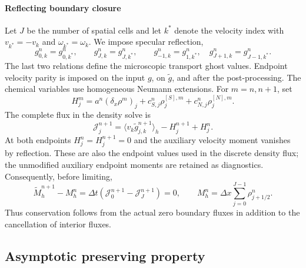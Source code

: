 \documentclass[11pt,twoside]{article}
\numberwithin{equation}{section}
\theoremstyle{plain}
\theoremstyle{nonumberplain}
\newif\ifrevisionred
\newenvironment{revisionblock}{\begingroup\ifrevisionred\color{red}\fi}{\endgroup}
\begin{document}
{\begin{revisionblock}
\paragraph{Reflecting boundary closure}
Let $J$ be the number of spatial cells and let $k^*$ denote the velocity index with
$v_{k^*}=-v_k$ and $\omega_{k^*}=\omega_k$. We impose specular reflection,
\[
g_{0,k}^n=g_{0,k^*}^n,\qquad g_{J,k}^n=g_{J,k^*}^n,
\qquad
g_{-1,k}^n=g_{1,k^*}^n,\quad g_{J+1,k}^n=g_{J-1,k^*}^n.
\]
The last two relations define the microscopic transport ghost values. Endpoint
velocity parity is imposed on the input $g$, on $\widetilde g$, and after the
post-processing. The chemical variables use homogeneous Neumann extensions.
For $m=n,n+1$, set
\[
H_j^m=a^n(\delta_x\rho^m)_j+c_{S,j}^n\rho_j^{[S],m}
+c_{N,j}^n\rho_j^{[N],m}.
\]
The complete flux in the density solve is
\[
\mathcal J_j^{n+1}=\langle v_k\widetilde g_{j,k}^{n+1}\rangle_h
-H_j^{n+1}+H_j^n.
\]
At both endpoints $H_j^n=H_j^{n+1}=0$ and the auxiliary velocity moment vanishes
by reflection. These are also the endpoint values used in the discrete density
flux; the unmodified auxiliary endpoint moments are retained as diagnostics.
Consequently, before limiting,
\[
\widetilde M_h^{n+1}-M_h^n
=\Delta t(\mathcal J_0^{n+1}-\mathcal J_J^{n+1})=0,
\qquad M_h^n=\Delta x\sum_{j=0}^{J-1}\rho_{j+1/2}^n.
\]
Thus conservation follows from the actual zero boundary fluxes in addition to
the cancellation of interior fluxes.
\end{revisionblock}

\subsection{Asymptotic preserving property}

}
\end{document}

